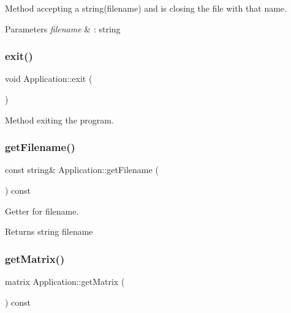 Method accepting a string(filename) and is closing the file with that name. 
\begin{DoxyParams}{Parameters}
{\em filename} & \+: string \\
\hline
\end{DoxyParams}
\mbox{\label{class_application_a3c8a98d6c10a5b054800488df16cdbcb}} 
\subsubsection{\texorpdfstring{exit()}{exit()}}
{\footnotesize\ttfamily void Application\+::exit (\begin{DoxyParamCaption}{ }\end{DoxyParamCaption})}

Method exiting the program. \mbox{\label{class_application_a778575fb76de5352152d8928e1c3410f}} 
\subsubsection{\texorpdfstring{get\+Filename()}{getFilename()}}
{\footnotesize\ttfamily const string\& Application\+::get\+Filename (\begin{DoxyParamCaption}{ }\end{DoxyParamCaption}) const\hspace{0.3cm}{\ttfamily [inline]}}

Getter for filename. \begin{DoxyReturn}{Returns}
string filename 
\end{DoxyReturn}
\mbox{\label{class_application_a67aeb617ca44a18045612d92f1d8afa0}} 
\subsubsection{\texorpdfstring{get\+Matrix()}{getMatrix()}}
{\footnotesize\ttfamily matrix Application\+::get\+Matrix (\begin{DoxyParamCaption}{ }\end{DoxyParamCaption}) const\hspace{0.3cm}{\ttfamily [inline]}}

